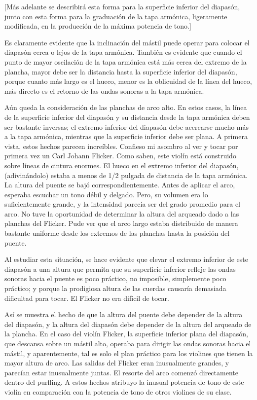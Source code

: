 \documentclass[12pt]{book}
\begin{document}
[Más adelante se describirá esta forma para la superficie inferior del diapasón, junto con esta forma para la graduación de la tapa armónica, ligeramente modificada, en la producción de la máxima potencia de tono.]

Es claramente evidente que la inclinación del mástil puede operar para colocar el diapasón cerca o lejos de la tapa armónica. También es evidente que cuando el punto de mayor oscilación de la tapa armónica está más cerca del extremo de la plancha, mayor debe ser la distancia hasta la superficie inferior del diapasón, porque cuanto más largo es el hueco, menor es la oblicuidad de la línea del hueco, más directo es el retorno de las ondas sonoras a la tapa armónica.

Aún queda la consideración de las planchas de arco alto. En estos casos, la línea de la superficie inferior del diapasón y su distancia desde la tapa armónica deben ser bastante inversas; el extremo inferior del diapasón debe acercarse mucho más a la tapa armónica, mientras que la superficie inferior debe ser plana. A primera vista, estos hechos parecen increíbles. Confieso mi asombro al ver y tocar por primera vez un Carl Johann Flicker. Como saben, este violín está construido sobre líneas de cintura enormes. El hueco en el extremo inferior del diapasón, (adivinándolo) estaba a menos de 1/2 pulgada de distancia de la tapa armónica. La altura del puente se bajó correspondientemente. Antes de aplicar el arco, esperaba escuchar un tono débil y delgado. Pero, su volumen era lo suficientemente grande, y la intensidad parecía ser del grado promedio para el arco. No tuve la oportunidad de determinar la altura del arqueado dado a las planchas del Flicker. Pude ver que el arco largo estaba distribuido de manera bastante uniforme desde los extremos de las planchas hasta la posición del puente.

Al estudiar esta situación, se hace evidente que elevar el extremo inferior de este diapasón a una altura que permita que su superficie inferior refleje las ondas sonoras hacia el puente es poco práctico, no imposible, simplemente poco práctico; y porque la prodigiosa altura de las cuerdas causaría demasiada dificultad para tocar. El Flicker no era difícil de tocar.

Así se muestra el hecho de que la altura del puente debe depender de la altura del diapasón, y la altura del diapasón debe depender de la altura del arqueado de la plancha. En el caso del violín Flicker, la superficie inferior plana del diapasón, que descansa sobre un mástil alto, operaba para dirigir las ondas sonoras hacia el mástil, y aparentemente, tal es solo el plan práctico para los violines que tienen la mayor altura de arco. Las salidas del Flicker eran inusualmente grandes, y parecían estar inusualmente juntas. El resorte del arco comenzó directamente dentro del purfling. A estos hechos atribuyo la inusual potencia de tono de este violín en comparación con la potencia de tono de otros violines de su clase.
\end{document}
